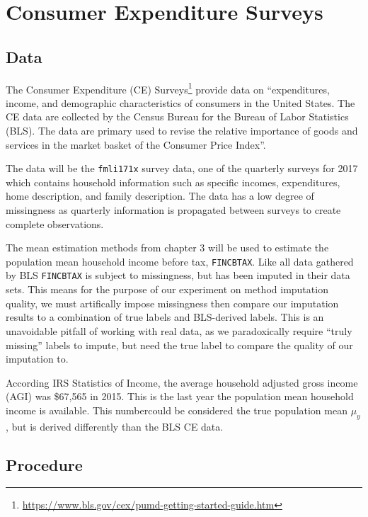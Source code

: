 \documentclass[12pt,twoside]{reedthesis}
\begin{document}
\chapter{Consumer Expenditure
Surveys}\label{consumer-expenditure-surveys}

\section{Data}\label{data}

The Consumer Expenditure (CE) Surveys\footnote{\url{https://www.bls.gov/cex/pumd-getting-started-guide.htm}}
provide data on ``expenditures, income, and demographic characteristics
of consumers in the United States. The CE data are collected by the
Census Bureau for the Bureau of Labor Statistics (BLS). The data are
primary used to revise the relative importance of goods and services in
the market basket of the Consumer Price Index''.

The data will be the \texttt{fmli171x} survey data, one of the quarterly
surveys for 2017 which contains household information such as specific
incomes, expenditures, home description, and family description. The
data has a low degree of missingness as quarterly information is
propagated between surveys to create complete observations.

The mean estimation methods from chapter 3 will be used to estimate the
population mean household income before tax, \texttt{FINCBTAX}. Like all
data gathered by BLS \texttt{FINCBTAX} is subject to missingness, but
has been imputed in their data sets. This means for the purpose of our
experiment on method imputation quality, we must artifically impose
missingness then compare our imputation results to a combination of true
labels and BLS-derived labels. This is an unavoidable pitfall of working
with real data, as we paradoxically require ``truly missing'' labels to
impute, but need the true label to compare the quality of our imputation
to.

According IRS Statistics of Income, the average household adjusted gross
income (AGI) was \$67,565 in 2015. This is the last year the population
mean household income is available. This numbercould be considered the
true population mean \(\mu_y\), but is derived differently than the BLS
CE data.

\section{Procedure}\label{procedure}
\end{document}
